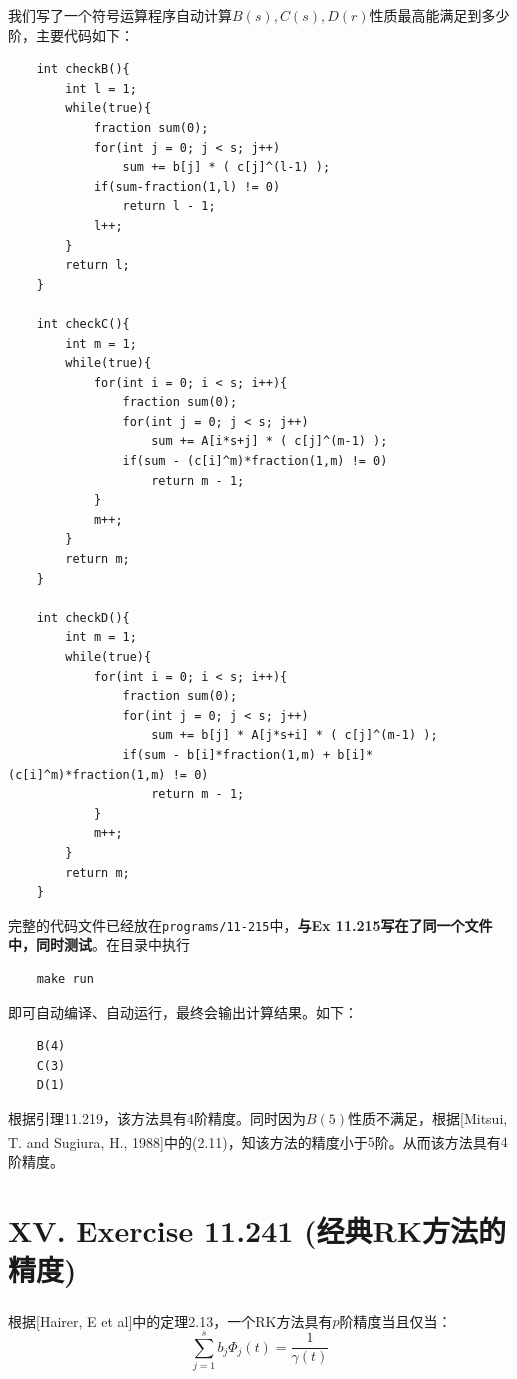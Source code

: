 \documentclass[twoside,a4paper]{article}
\begin{document}
\;\;\;\;\;\;我们写了一个符号运算程序自动计算$B(s),C(s),D(r)$性质最高能满足到多少阶，主要代码如下：
\begin{lstlisting}
    int checkB(){
        int l = 1;
        while(true){
            fraction sum(0);
            for(int j = 0; j < s; j++)
                sum += b[j] * ( c[j]^(l-1) );
            if(sum-fraction(1,l) != 0)
                return l - 1;
            l++;
        }
        return l;
    }
    
    int checkC(){
        int m = 1;
        while(true){
            for(int i = 0; i < s; i++){
                fraction sum(0);
                for(int j = 0; j < s; j++)
                    sum += A[i*s+j] * ( c[j]^(m-1) );
                if(sum - (c[i]^m)*fraction(1,m) != 0)
                    return m - 1;
            }
            m++;
        }
        return m;
    }
    
    int checkD(){
        int m = 1;
        while(true){
            for(int i = 0; i < s; i++){
                fraction sum(0);
                for(int j = 0; j < s; j++)
                    sum += b[j] * A[j*s+i] * ( c[j]^(m-1) );
                if(sum - b[i]*fraction(1,m) + b[i]*(c[i]^m)*fraction(1,m) != 0)
                    return m - 1;
            }
            m++;
        }
        return m;
    }
\end{lstlisting}

完整的代码文件已经放在\verb|programs/11-215|中，\textbf{与Ex 11.215写在了同一个文件中，同时测试}。在目录中执行
\begin{lstlisting}
    make run
\end{lstlisting}

即可自动编译、自动运行，最终会输出计算结果。如下：
\begin{lstlisting}
    B(4)
    C(3)
    D(1)
\end{lstlisting}

根据引理11.219，该方法具有$4$阶精度。同时因为$B(5)$性质不满足，根据[Mitsui, T.  and  Sugiura, H., 1988]\textsuperscript{\cite{1988A}}中的(2.11)，知该方法的精度小于$5$阶。从而该方法具有$4$阶精度。

\section*{XV. Exercise 11.241 (经典RK方法的精度)}

\;\;\;\;\;\;根据[Hairer, E et al]\textsuperscript{\cite{1987Solving}}中的定理2.13，一个RK方法具有$p$阶精度当且仅当：
\begin{equation*}
    \sum_{j=1}^s b_j\Phi_j(t)=\frac{1}{\gamma(t)}
\end{equation*}
\end{document}
